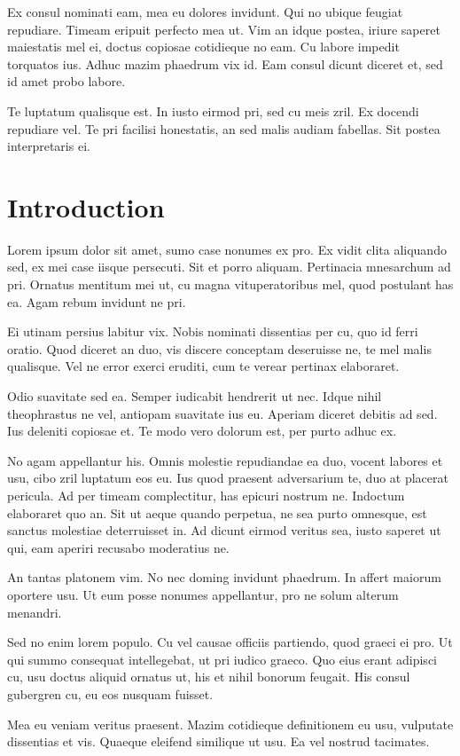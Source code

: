 \documentclass{article}
\begin{document}
Ex consul nominati eam, mea eu dolores invidunt. Qui no ubique feugiat repudiare. Timeam eripuit perfecto mea ut. Vim an idque postea, iriure saperet maiestatis mel ei, doctus copiosae cotidieque no eam. Cu labore impedit torquatos ius. Adhuc mazim phaedrum vix id. Eam consul dicunt diceret et, sed id amet probo labore.

Te luptatum qualisque est. In iusto eirmod pri, sed cu meis zril. Ex docendi repudiare vel. Te pri facilisi honestatis, an sed malis audiam fabellas. Sit postea interpretaris ei.
\section{Introduction}
Lorem ipsum dolor sit amet, sumo case nonumes ex pro. Ex vidit clita aliquando sed, ex mei case iisque persecuti. Sit et porro aliquam. Pertinacia mnesarchum ad pri. Ornatus mentitum mei ut, cu magna vituperatoribus mel, quod postulant has ea. Agam rebum invidunt ne pri.

Ei utinam persius labitur vix. Nobis nominati dissentias per cu, quo id ferri oratio. Quod diceret an duo, vis discere conceptam deseruisse ne, te mel malis qualisque. Vel ne error exerci eruditi, cum te verear pertinax elaboraret.


Odio suavitate sed ea. Semper iudicabit hendrerit ut nec. Idque nihil theophrastus ne vel, antiopam suavitate ius eu. Aperiam diceret debitis ad sed. Ius deleniti copiosae et. Te modo vero dolorum est, per purto adhuc ex.

No agam appellantur his. Omnis molestie repudiandae ea duo, vocent labores et usu, cibo zril luptatum eos eu. Ius quod praesent adversarium te, duo at placerat pericula. Ad per timeam complectitur, has epicuri nostrum ne. Indoctum elaboraret quo an. Sit ut aeque quando perpetua, ne sea purto omnesque, est sanctus molestiae deterruisset in. Ad dicunt eirmod veritus sea, iusto saperet ut qui, eam aperiri recusabo moderatius ne.

An tantas platonem vim. No nec doming invidunt phaedrum. In affert maiorum oportere usu. Ut eum posse nonumes appellantur, pro ne solum alterum menandri.

Sed no enim lorem populo. Cu vel causae officiis partiendo, quod graeci ei pro. Ut qui summo consequat intellegebat, ut pri iudico graeco. Quo eius erant adipisci cu, usu doctus aliquid ornatus ut, his et nihil bonorum feugait. His consul gubergren cu, eu eos nusquam fuisset.

Mea eu veniam veritus praesent. Mazim cotidieque definitionem eu usu, vulputate dissentias et vis. Quaeque eleifend similique ut usu. Ea vel nostrud tacimates.
\end{document}
